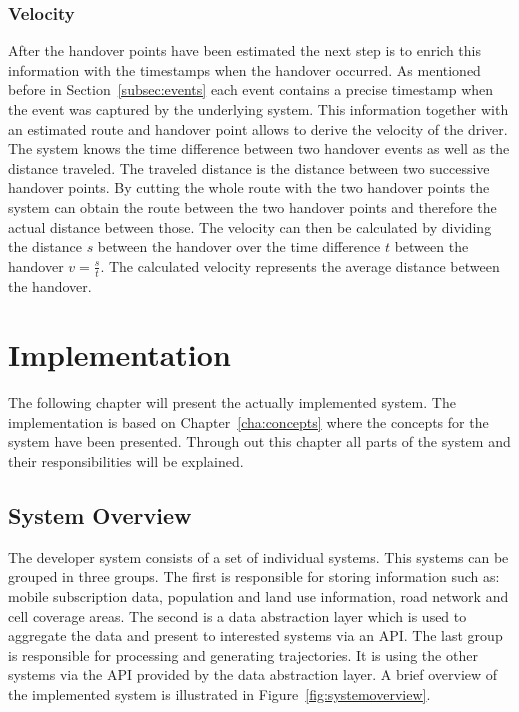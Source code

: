 \documentclass[master,english]{hgbthesis}
\begin{document}
\subsection{Velocity}

After the handover points have been estimated the next step is to enrich this information with the timestamps when the handover occurred. As mentioned before in Section~\ref{subsec:events} each event contains a precise timestamp when the event was captured by the underlying system. This information together with an estimated route and handover point allows to derive the velocity of the driver. The system knows the time difference between two handover events as well as the distance traveled. The traveled distance is the distance between two successive handover points. By cutting the whole route with the two handover points the system can obtain the route between the two handover points and therefore the actual distance between those. The velocity can then be calculated  by dividing the distance $s$ between the handover over the time difference $t$ between the handover $v=\frac{s}{t}$. The calculated velocity represents the average distance between the handover.%



\chapter{Implementation}

\label{cha:implementation}

The following chapter will present the actually implemented system. The implementation is based on Chapter~\ref{cha:concepts} where the concepts for the system have been presented. Through out this chapter all parts of the system and their responsibilities will be explained.  

\section{System Overview}

The developer system consists of a set of individual systems. This systems can be grouped in three groups. The first is responsible for storing information such as: mobile subscription data, population and land use information, road network and cell coverage areas. The second is a data abstraction layer which is used to aggregate the data and present to interested systems via an API. The last group is responsible for processing and generating trajectories. It is using the other systems via the API provided by the data abstraction layer. A brief overview of the implemented system is illustrated in Figure~\ref{fig:systemoverview}.
\end{document}
